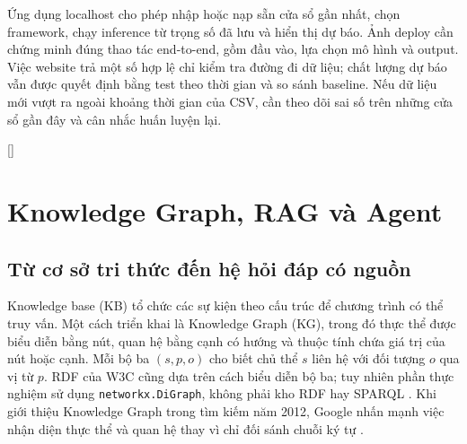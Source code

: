 \documentclass[12pt,a4paper]{report}
\begin{document}
Ứng dụng localhost cho phép nhập hoặc nạp sẵn cửa sổ gần nhất, chọn framework, chạy inference từ trọng số đã lưu và hiển thị dự báo. Ảnh deploy cần chứng minh đúng thao tác end-to-end, gồm đầu vào, lựa chọn mô hình và output. Việc website trả một số hợp lệ chỉ kiểm tra đường đi dữ liệu; chất lượng dự báo vẫn được quyết định bằng test theo thời gian và so sánh baseline. Nếu dữ liệu mới vượt ra ngoài khoảng thời gian của CSV, cần theo dõi sai số trên những cửa sổ gần đây và cân nhắc huấn luyện lại.


\clearpage
\begingroup
\color{black}
\titleformat{\chapter}[display]{\normalfont\bfseries\color{black}}{\filleft\Large\chaptertitlename\ \thechapter}{1ex}{\titlerule\vspace{1ex}\filright\LARGE}[\vspace{1ex}\titlerule]
\titleformat{\section}{\normalfont\Large\bfseries\color{black}}{\thesection}{1em}{}
\titleformat{\subsection}{\normalfont\large\bfseries\color{black}}{\thesubsection}{1em}{}
\hypersetup{linkcolor=black,urlcolor=black,citecolor=black}

\chapter{Knowledge Graph, RAG và Agent}\label{ch:kb-rag}
\section{Từ cơ sở tri thức đến hệ hỏi đáp có nguồn}
Knowledge base (KB) tổ chức các sự kiện theo cấu trúc để chương trình có thể truy vấn. Một cách triển khai là Knowledge Graph (KG), trong đó thực thể được biểu diễn bằng nút, quan hệ bằng cạnh có hướng và thuộc tính chứa giá trị của nút hoặc cạnh. Mỗi bộ ba $(s,p,o)$ cho biết chủ thể $s$ liên hệ với đối tượng $o$ qua vị từ $p$. RDF của W3C cũng dựa trên cách biểu diễn bộ ba; tuy nhiên phần thực nghiệm sử dụng \texttt{networkx.DiGraph}, không phải kho RDF hay SPARQL \cite{essay03-w3c}. Khi giới thiệu Knowledge Graph trong tìm kiếm năm 2012, Google nhấn mạnh việc nhận diện thực thể và quan hệ thay vì chỉ đối sánh chuỗi ký tự \cite{essay03-google}.
\end{document}
